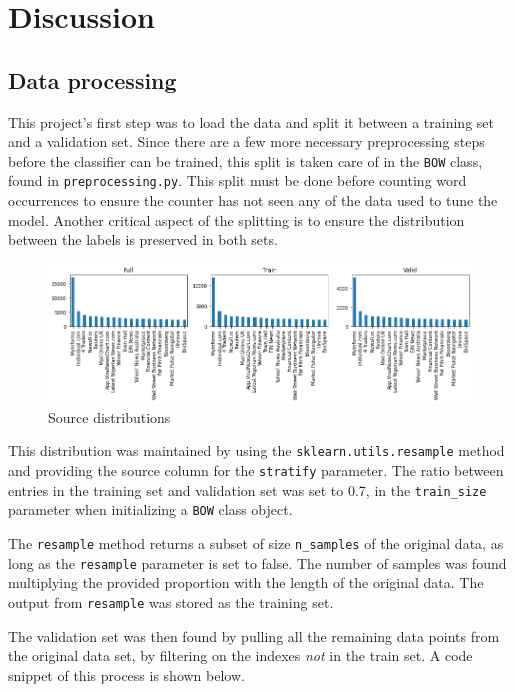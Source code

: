 \section{Discussion}
\label{chap:Discussion}

\subsection{Data processing}
\label{chap:Data processing}

\quad This project's first step was to load the data and split it between a training set and a validation set. Since there are a few more necessary preprocessing steps before the classifier can be trained, this split is taken care of in the \texttt{BOW} class, found in \texttt{preprocessing.py}.
This split must be done before counting word occurrences to ensure the counter has not seen any of the data used to tune the model. 
Another critical aspect of the splitting is to ensure the distribution between the labels is preserved in both sets.

\begin{figure}[!h]
\centering
\includegraphics[width=1\linewidth]{pictures/source_dist.png}
\caption{Source distributions}
\end{figure}

This distribution was maintained by using the \texttt{sklearn.utils.resample} method and providing the source column for the \texttt{stratify} parameter. The ratio between entries in the training set and validation set was set to 0.7, in the \texttt{train\_size} parameter when initializing a \texttt{BOW} class object. 

The \texttt{resample} method returns a subset of size \texttt{n\_samples} of the original data, as long as the \texttt{resample} parameter is set to false. The number of samples was found multiplying the provided proportion with the length of the original data. The output from \texttt{resample} was stored as the training set. 

The validation set was then found by pulling all the remaining data points from the original data set, by filtering on the indexes \textit{not} in the train set. A code snippet of this process is shown below.

